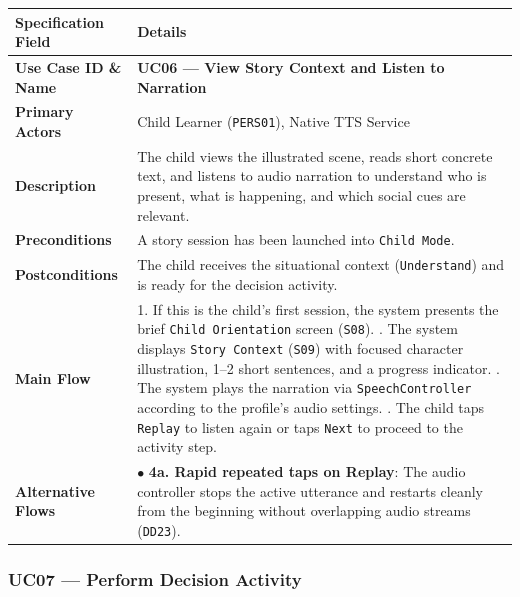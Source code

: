 \noindent\begin{xltabular}{\textwidth}{|p{4.0cm}|X|}
\hline
\textbf{Specification Field} & \textbf{Details} \\ \hline
\endhead
\textbf{Use Case ID \& Name} & \textbf{UC06 — View Story Context and Listen to Narration} \\ \hline
\textbf{Primary Actors} & Child Learner (\texttt{PERS01}), Native TTS Service \\ \hline
\textbf{Description} & The child views the illustrated scene, reads short concrete text, and listens to audio narration to understand who is present, what is happening, and which social cues are relevant. \\ \hline
\textbf{Preconditions} & A story session has been launched into \texttt{Child Mode}. \\ \hline
\textbf{Postconditions} & The child receives the situational context (\texttt{Understand}) and is ready for the decision activity. \\ \hline
\textbf{Main Flow} & 1. If this is the child's first session, the system presents the brief \texttt{Child Orientation} screen (\texttt{S08}). . The system displays \texttt{Story Context} (\texttt{S09}) with focused character illustration, 1–2 short sentences, and a progress indicator. . The system plays the narration via \texttt{SpeechController} according to the profile's audio settings. . The child taps \texttt{Replay} to listen again or taps \texttt{Next} to proceed to the activity step. \\ \hline
\textbf{Alternative Flows} & $\bullet$ \textbf{4a. Rapid repeated taps on Replay}: The audio controller stops the active utterance and restarts cleanly from the beginning without overlapping audio streams (\texttt{DD23}). \\ \hline
\end{xltabular}



\subsubsection{UC07 — Perform Decision Activity}


